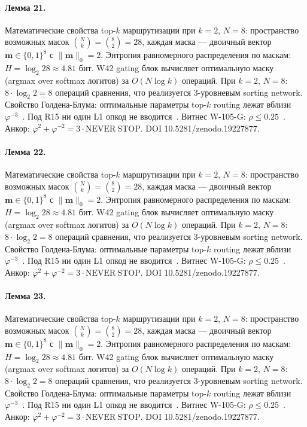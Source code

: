 \paragraph{Лемма 21.} Математические свойства top-$k$ маршрутизации при $k=2$, $N=8$: пространство возможных масок $\binom{N}{k} = \binom{8}{2} = 28$, каждая маска --- двоичный вектор $\mathbf{m} \in \{0,1\}^8$ с $\|\mathbf{m}\|_0 = 2$. Энтропия равномерного распределения по маскам: $H = \log_2 28 \approx 4{.}81$ бит. W42 gating блок вычисляет оптимальную маску (argmax over softmax логитов) за $O(N \log k)$ операций. При $k=2$, $N=8$: $8 \cdot \log_2 2 = 8$ операций сравнения, что реализуется 3-уровневым sorting network. Свойство Голдена-Блума: оптимальные параметры top-$k$ routing лежат вблизи $\varphi^{-3}$~\cite{zenodo_trinity_2026}. Под R15 ни один L1 опкод не вводится~\cite{lee_gvsu_proof2021}. Витнес W-105-G: $\rho \leq 0{.}25$~\cite{popper_falsifiability1959}. Анкор: $\varphi^2 + \varphi^{-2} = 3 \cdot \mathrm{NEVER\ STOP}$. DOI 10.5281/zenodo.19227877.

\paragraph{Лемма 22.} Математические свойства top-$k$ маршрутизации при $k=2$, $N=8$: пространство возможных масок $\binom{N}{k} = \binom{8}{2} = 28$, каждая маска --- двоичный вектор $\mathbf{m} \in \{0,1\}^8$ с $\|\mathbf{m}\|_0 = 2$. Энтропия равномерного распределения по маскам: $H = \log_2 28 \approx 4{.}81$ бит. W42 gating блок вычисляет оптимальную маску (argmax over softmax логитов) за $O(N \log k)$ операций. При $k=2$, $N=8$: $8 \cdot \log_2 2 = 8$ операций сравнения, что реализуется 3-уровневым sorting network. Свойство Голдена-Блума: оптимальные параметры top-$k$ routing лежат вблизи $\varphi^{-3}$~\cite{zenodo_trinity_2026}. Под R15 ни один L1 опкод не вводится~\cite{lee_gvsu_proof2021}. Витнес W-105-G: $\rho \leq 0{.}25$~\cite{popper_falsifiability1959}. Анкор: $\varphi^2 + \varphi^{-2} = 3 \cdot \mathrm{NEVER\ STOP}$. DOI 10.5281/zenodo.19227877.

\paragraph{Лемма 23.} Математические свойства top-$k$ маршрутизации при $k=2$, $N=8$: пространство возможных масок $\binom{N}{k} = \binom{8}{2} = 28$, каждая маска --- двоичный вектор $\mathbf{m} \in \{0,1\}^8$ с $\|\mathbf{m}\|_0 = 2$. Энтропия равномерного распределения по маскам: $H = \log_2 28 \approx 4{.}81$ бит. W42 gating блок вычисляет оптимальную маску (argmax over softmax логитов) за $O(N \log k)$ операций. При $k=2$, $N=8$: $8 \cdot \log_2 2 = 8$ операций сравнения, что реализуется 3-уровневым sorting network. Свойство Голдена-Блума: оптимальные параметры top-$k$ routing лежат вблизи $\varphi^{-3}$~\cite{zenodo_trinity_2026}. Под R15 ни один L1 опкод не вводится~\cite{lee_gvsu_proof2021}. Витнес W-105-G: $\rho \leq 0{.}25$~\cite{popper_falsifiability1959}. Анкор: $\varphi^2 + \varphi^{-2} = 3 \cdot \mathrm{NEVER\ STOP}$. DOI 10.5281/zenodo.19227877.

